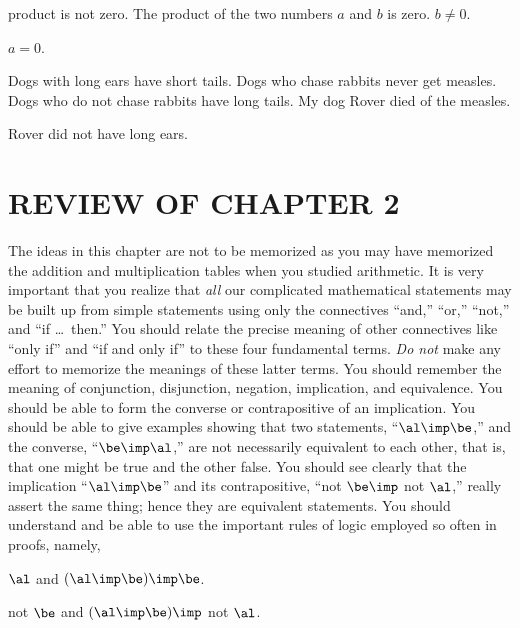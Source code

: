 \documentclass[11pt]{book}
\theoremstyle{bkplain}
\theoremstyle{XIplainnote}
\theoremstyle{bkplain}
\theoremstyle{bkplain}
\begin{document}
\begin{exercisecols}
\begin{exlist}
\begin{hyp}
      product is not zero. The product of the two numbers $a$ and $b$ is zero.
      $b \neq 0$.\end{hyp}
      \begin{thmclaim}$a = 0$.\end{thmclaim}
\item[\stex 20.] \begin{hyp}Dogs with long ears have short tails. Dogs who chase
      rabbits never get measles. Dogs who do not chase rabbits have long tails. My
      dog Rover died of the measles.\end{hyp}
      \begin{thmclaim}Rover did not have long ears.\end{thmclaim}
\end{exlist}
\end{exercisecols}

\section*{REVIEW OF CHAPTER 2}

The ideas in this chapter are not to be memorized as you may have memorized the
addition and multiplication tables when you studied arithmetic. It is very
important that you realize that \emph{all} our complicated mathematical statements
may be built up from simple statements using only the connectives ``and,'' ``or,''
``not,'' and ``if \dots\ then.'' You should relate the precise meaning of other
connectives like ``only if'' and ``if and only if'' to these four fundamental
terms. \emph{Do not} make any effort to memorize the meanings of these latter
terms. You should remember the meaning of conjunction, disjunction, negation,
implication, and equivalence. You should be able to form the converse or
contrapositive of an implication. You should be able to give examples showing that
two statements, ``$\al \imp \be$,'' and the converse, ``$\be \imp \al$,'' are not
necessarily equivalent to each other, that is, that one might be true and the
other false. You should see clearly that the implication ``$\al \imp \be$'' and its
contrapositive, ``not $\be \imp$ not $\al$,'' really assert the same thing; hence
they are equivalent statements. You should understand and be able to use the
important rules of logic employed so often in proofs, namely,

\begin{exlist}
\item $\al$ and $(\al \imp \be) \imp \be$.
\item not $\be$ and $(\al \imp \be) \imp$ not $\al$.
\end{exlist}
\end{document}
